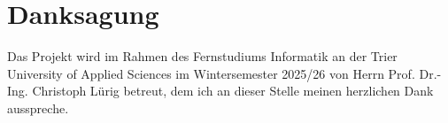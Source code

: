 \section{Danksagung}

Das Projekt wird im Rahmen des Fernstudiums Informatik an der Trier University of Applied Sciences im Wintersemester 2025/26 von Herrn Prof. Dr.-Ing. Christoph Lürig betreut, dem ich an dieser Stelle meinen herzlichen Dank ausspreche.